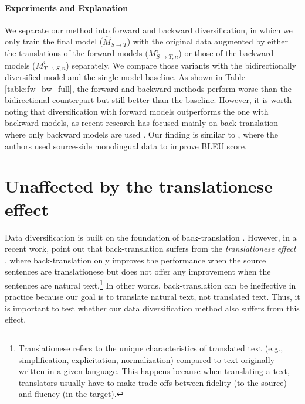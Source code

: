 \documentclass{article}
\begin{document}
\paragraph{Experiments and Explanation} 
We separate our method into forward and backward diversification, in which we only train the final model ($\hat{M}_{S \rightarrow T}$) with the original data augmented by either the translations of the forward models ($M_{S \rightarrow T,n}^i$) or those of the backward models ($M_{T \rightarrow S,n}^i$) separately. We compare those variants with the bidirectionally diversified model and the single-model baseline. 
As shown in Table \ref{table:fw_bw_full}, the forward and backward methods perform worse than the bidirectional counterpart but still better than the baseline. However, it is worth noting that diversification with forward models outperforms the one with backward models, as recent research has focused mainly on back-translation where only backward models are used
\citep{backtranslate_sennrich-etal-2016-improving,understanding_backtranslation_scale}. 
Our finding is similar to \citet{exploit_src_monolingual}, where the authors used source-side monolingual data to improve BLEU score. 



\section{Unaffected by the translationese effect}

{
Data diversification is built on the foundation of back-translation \citep{backtranslate_sennrich-etal-2016-improving,understanding_backtranslation_scale}. However, in a recent work, \citet{eval_back_translation_translationese} point out that back-translation suffers from the \emph{translationese effect} \citep{Volansky-translationese}, where back-translation only improves the performance when the source sentences are translationese but does not offer any improvement when the sentences are natural text.\footnote{Translationese refers to the unique characteristics of translated text (e.g., simplification, explicitation, normalization) compared to text originally written in a given language. This happens because when translating a text, translators usually have to make trade-offs between fidelity (to the source) and fluency (in the target).} In other words, back-translation can be ineffective in practice because our goal is to translate natural text, not translated text. Thus, it is important to test whether our data diversification method also suffers from this effect.
}
\end{document}
